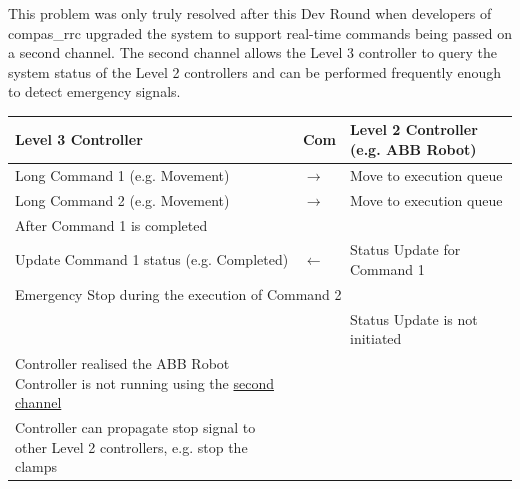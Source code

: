 \documentclass[11pt]{book}
\begin{document}
This problem was only truly resolved after this Dev Round when developers of compas\_rrc upgraded the system to support real-time commands being passed on a second channel. The second channel allows the Level 3 controller to query the system status of the Level 2 controllers and can be performed frequently enough to detect emergency signals.

\begin{table}[H]
\begin{adjustbox}{max width=\textwidth}
\begin{tabular}{p{7.04cm}p{1.67cm}p{7.17cm}}
\hline
\multicolumn{1}{|p{7.04cm}}{{\footnotesize \textbf{Level 3 Controller}}} & 
\multicolumn{1}{|p{1.67cm}}{{\footnotesize \textbf{Com}}} & 
\multicolumn{1}{|p{7.17cm}|}{{\footnotesize \textbf{Level 2 Controller (e.g. ABB Robot)}}} \\ 
\hline
\multicolumn{1}{|p{7.04cm}}{{\footnotesize Long Command 1 (e.g. Movement)}} & 
\multicolumn{1}{|p{1.67cm}}{\centering
{\footnotesize $\rightarrow$}} & 
\multicolumn{1}{|p{7.17cm}|}{{\footnotesize Move to execution queue}} \\ 
\hline
\multicolumn{1}{|p{7.04cm}}{{\footnotesize Long Command 2 (e.g. Movement)}} & 
\multicolumn{1}{|p{1.67cm}}{\centering
{\footnotesize $\rightarrow$}} & 
\multicolumn{1}{|p{7.17cm}|}{{\footnotesize Move to execution queue}} \\ 
\hline
\multicolumn{3}{|p{15.87cm}|}{{\footnotesize After Command 1 is completed}} \\ 
\hline
\multicolumn{1}{|p{7.04cm}}{{\footnotesize Update Command 1 status (e.g. Completed)}} & 
\multicolumn{1}{|p{1.67cm}}{\centering
{\footnotesize $\leftarrow$}} & 
\multicolumn{1}{|p{7.17cm}|}{{\footnotesize Status Update for Command 1}} \\ 
\hline
\multicolumn{3}{|p{15.87cm}|}{{\footnotesize Emergency Stop during the execution of Command 2}} \\ 
\hline
\multicolumn{1}{|p{7.04cm}}{} & 
\multicolumn{1}{|p{1.67cm}}{} & 
\multicolumn{1}{|p{7.17cm}|}{{\footnotesize Status Update is not initiated}} \\ 
\hline
\multicolumn{1}{|p{7.04cm}}{{\footnotesize Controller realised the ABB Robot Controller is not running using the \uline{second channel}}} & 
\multicolumn{1}{|p{1.67cm}}{} & 
\multicolumn{1}{|p{7.17cm}|}{} \\ 
\hline
\multicolumn{1}{|p{7.04cm}}{{\footnotesize Controller can propagate stop signal to other Level 2 controllers, e.g. stop the clamps}} & 
\multicolumn{1}{|p{1.67cm}}{} & 
\multicolumn{1}{|p{7.17cm}|}{} \\ 
\hline
\end{tabular}
\end{adjustbox}
\end{table}
\vspace{7\baselineskip}
\end{document}
